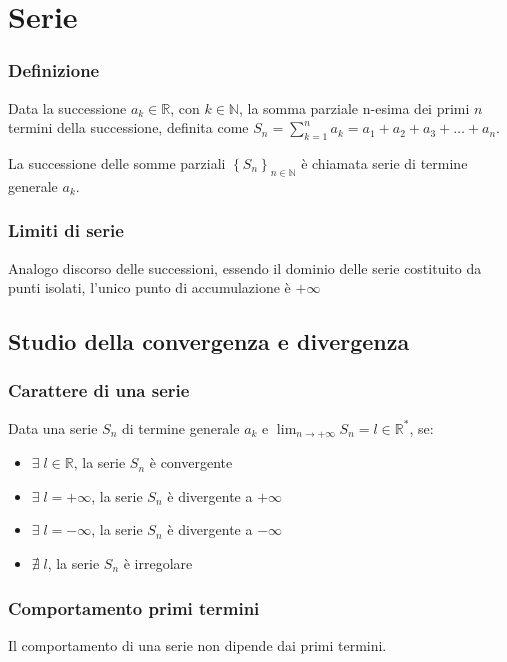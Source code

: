 \documentclass[a4paper]{article}
\begin{document}
\section{Serie}
\subsubsection*{Definizione}
Data la successione \(a_k \in \mathbb{R}\), con \(k \in \mathbb{N}\), la somma parziale n-esima dei primi \(n\) termini della successione,
definita come \(\displaystyle S_n = \sum_{k = 1}^{n} a_k = a_1 + a_2 + a_3 + \dots + a_n\).

La successione delle somme parziali \(\left\{ S_n \right\}_{n \in \mathbb{N}}\) è chiamata serie di termine generale \(a_k\).

\subsubsection*{Limiti di serie}
Analogo discorso delle successioni, essendo il dominio delle serie costituito da punti isolati, l'unico punto di accumulazione è \(+ \infty\)

\subsection{Studio della convergenza e divergenza}
\subsubsection*{Carattere di una serie}
Data una serie \(S_n\) di termine generale \(a_k\) e \(\displaystyle \lim_{n \to +\infty} S_n = l \in \mathbb{R}^*\), se:
\begin{itemize}
	\item \(\exists \; l \in \mathbb{R}\), la serie \(S_n\) è convergente
	\item \(\exists \; l = + \infty\), la serie \(S_n\) è divergente a \(+ \infty\)
	\item \(\exists \; l = - \infty\), la serie \(S_n\) è divergente a \(- \infty\)
	\item \(\nexists \; l\), la serie \(S_n\) è irregolare
\end{itemize}

\subsubsection*{Comportamento primi termini}
Il comportamento di una serie non dipende dai primi termini.
\end{document}
